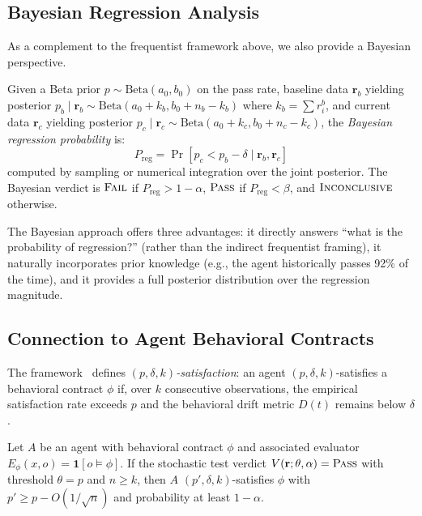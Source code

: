 \subsection{Bayesian Regression Analysis}
\label{sec:stochastic:bayesian}

As a complement to the frequentist framework above, we also provide a
Bayesian perspective.

\begin{definition}
\label{def:bayesian}
Given a Beta prior $p \sim \text{Beta}(a_0, b_0)$ on the pass rate,
baseline data $\mathbf{r}_b$ yielding posterior
$p_b \mid \mathbf{r}_b \sim \text{Beta}(a_0 + k_b, b_0 + n_b - k_b)$
where $k_b = \sum r_i^b$, and current data $\mathbf{r}_c$ yielding
posterior
$p_c \mid \mathbf{r}_c \sim \text{Beta}(a_0 + k_c, b_0 + n_c - k_c)$,
the \emph{Bayesian regression probability} is:
\begin{equation}
\label{eq:bayesian-regression}
  P_{\text{reg}} = \Pr[p_c < p_b - \delta \mid \mathbf{r}_b, \mathbf{r}_c]
\end{equation}
computed by sampling or numerical integration over the joint posterior.
The Bayesian verdict is $\textsc{Fail}$ if $P_{\text{reg}} > 1 - \alpha$,
$\textsc{Pass}$ if $P_{\text{reg}} < \beta$, and $\textsc{Inconclusive}$ otherwise.
\end{definition}

The Bayesian approach offers three advantages: it directly answers ``what
is the probability of regression?'' (rather than the indirect frequentist
framing), it naturally incorporates prior knowledge (e.g., the agent
historically passes 92\% of the time), and it provides a full posterior
distribution over the regression magnitude.

\subsection{Connection to Agent Behavioral Contracts}
\label{sec:stochastic:abc}

The \agentassert{} framework~\citep{bhardwaj2026abc} defines
\emph{$(p, \delta, k)$-satisfaction}: an agent $(p, \delta, k)$-satisfies
a behavioral contract $\phi$ if, over $k$ consecutive observations, the
empirical satisfaction rate exceeds $p$ and the behavioral drift metric
$D(t)$ remains below $\delta$.

\begin{proposition}
\label{prop:verdict-contract}
Let $A$ be an agent with behavioral contract $\phi$ and associated
evaluator $E_\phi(x, o) = \mathbf{1}[o \models \phi]$. If the
stochastic test verdict $V(\mathbf{r}; \theta, \alpha) = \textsc{Pass}$ with
threshold $\theta = p$ and $n \geq k$, then $A$
$(p', \delta, k)$-satisfies $\phi$ with
$p' \geq p - O(1/\sqrt{n})$ and probability at least $1 - \alpha$.
\end{proposition}

